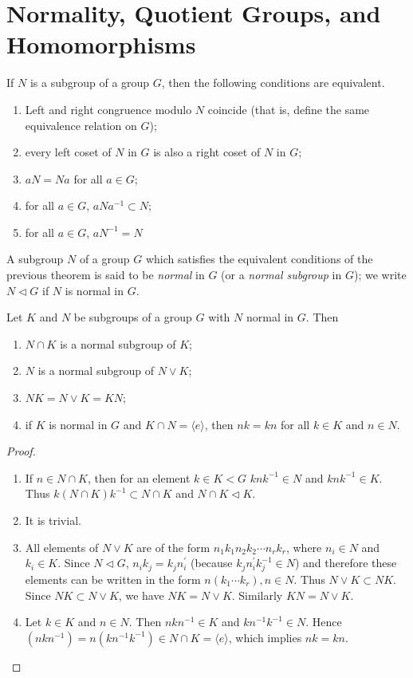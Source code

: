 \section{Normality, Quotient Groups, and Homomorphisms}
\begin{Theorem}
	If $ N $ is a subgroup of a group $ G $, then the following conditions are equivalent.
	\begin{enumerate}
		\item Left and right congruence modulo $ N $ coincide (that is, define the same equivalence relation on $ G $);
		\item every left coset of $ N $ in $ G $ is also a right coset of $ N $ in $ G $;
		\item $ aN = Na $ for all $ a\in G $;
		\item for all $ a\in G $, $ aNa^{-1}\subset N $;
		\item for all $ a \in G $, $ aN^{-1}=N $
	\end{enumerate}
\end{Theorem}
\begin{Definition}
	A subgroup $ N $ of a group $ G $ which satisfies the equivalent conditions of the previous theorem is said to be \textit{normal} in $ G $ (or a \textit{normal subgroup} in $ G $); we write $ N\vartriangleleft G$ if $ N $ is normal in $ G $.
\end{Definition}
\begin{Theorem}
	Let $ K $ and $ N $ be subgroups of a group $ G $ with $ N $ normal in $ G $. Then
	\begin{enumerate}
		\item $ N \cap K $ is a normal subgroup of $ K $;
		\item $ N $ is a normal subgroup of $ N \vee K $;
		\item $ NK = N \vee K = KN $;
		\item if $ K $ is normal in $ G $ and $ K \cap N = \langle e\rangle $, then $ nk=kn $ for all $ k\in K $ and $ n \in N $.
	\end{enumerate}
\end{Theorem}
\begin{proof}
	\begin{enumerate}
		\item If $ n \in N\cap K $, then for an element $ k \in K <G $ $ knk^{-1}\in N $ and $ knk^{-1}\in K $. Thus $ k (N \cap K)k^{-1}\subset N \cap K $ and $ N \cap K \vartriangleleft K $.
		\item It is trivial.
		\item All elements of $ N \vee K $ are of the form $ n_1 k_1 n_2 k_2 \cdots n_r k_r $, where $ n_i \in N $ and $ k_i \in K $. Since $ N \vartriangleleft G $, $ n_i k_j = k_j n_i^\prime $ (because $ k_j n_i^\prime k_j^{-1}\in N $) and therefore these elements can be written in the form $ n(k_1\cdots k_r) ,n \in N$. Thus $ N \vee K \subset NK $. Since $ NK \subset N \vee K $, we have $ NK =  N \vee K$. Similarly $ KN = N \vee K $.
		\item Let $ k \in K $ and $ n \in N $. Then $ nkn^{-1}\in K $ and $ k n^{-1}k^{-1}\in N $. Hence $ (nkn^{-1}) =n(kn^{-1}k^{-1})\in N \cap K = \langle e \rangle $, which implies $ nk = kn $.
	\end{enumerate}
\end{proof}
